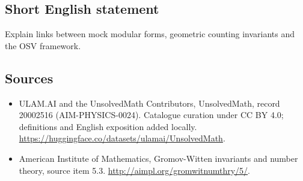 \documentclass[11pt]{article}
\begin{document}
\subsection{Short English statement}
Explain links between mock modular forms, geometric counting invariants and the OSV framework.
\subsection{Sources}
\begin{itemize}
\item[\hypertarget{source:20002516:1}{S1}] ULAM.AI and the UnsolvedMath Contributors, UnsolvedMath, record 20002516 (AIM-PHYSICS-0024). Catalogue curation under CC BY 4.0; definitions and English exposition added locally.
\url{https://huggingface.co/datasets/ulamai/UnsolvedMath}.
\item[\hypertarget{source:20002516:2}{S2}] American Institute of Mathematics, Gromov-Witten invariants and number theory, source item 5.3.
\url{http://aimpl.org/gromwitnumthry/5/}.
\end{itemize}
\label{end:20002516}
\end{document}
